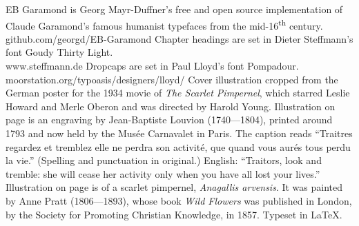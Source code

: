 \documentclass[
a5paper,
BCOR=7mm,
twoside,
DIV=calc,
12pt,
usegeometry,
chapterprefix,
endperiod,
headings=big]{scrbook}
\begin{document}
\centering
EB Garamond is Georg Mayr-Duffner's free and open source implementation of Claude Garamond's famous humanist typefaces from the mid-16\textsuperscript{th} century. \\github.com/georgd/EB-Garamond
\vfill
Chapter headings are set in Dieter Steffmann's font Goudy Thirty Light.\\www.steffmann.de
\vfill
Dropcaps are set in Paul Lloyd's font Pompadour.\\moorstation.org/typoasis/designers/lloyd/
\vfill
Cover illustration cropped from the German poster for the 1934 movie of \textit{The Scarlet Pimpernel}, which starred Leslie Howard and Merle Oberon and was directed by Harold Young.
\vfill
Illustration on page \pageref{guillotine} is an engraving by Jean-Baptiste Louvion (1740---1804), printed around 1793 and now held by the Musée Carnavalet in Paris. The caption reads \enquote{Traitres regardez et tremblez elle ne perdra son activité, que quand vous aurés tous perdu la vie.} (Spelling and punctuation in original.) English: \enquote{Traitors, look and tremble: she will cease her activity only when you have all lost your lives.}
\vfill
Illustration on page \pageref{flowers} is of a scarlet pimpernel, \textit{Anagallis arvensis}. It was painted by Anne Pratt (1806---1893), whose book \textit{Wild Flowers} was published in London, by the Society for Promoting Christian Knowledge, in 1857. 
\vfill
Typeset in \LaTeX{}.
\thispagestyle{empty}
\end{document}
